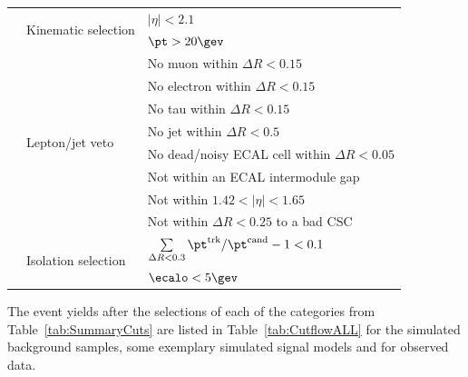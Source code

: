 \begin{table}[!h]
{\begin{tabular}{l|l|l}
                                                              &  \multirow{2}{*}{Kinematic selection}      & $|\eta|<2.1$ \\
                                                              &                                            & $\pt>20\gev$ \\\cmidrule{2-3}

                                                              &  \multirow{8}{*}{Lepton/jet veto}          & No muon within $\Delta R<0.15$ \\
                                                              &                                            & No electron within $\Delta R<0.15$ \\
                                                              &                                            & No tau within $\Delta R<0.15$ \\
                                                              &                                            & No jet within $\Delta R<0.5$ \\
                                                              &                                            & No dead/noisy ECAL cell within $\Delta R<0.05$  \\
                                                              &                                            & Not within an ECAL intermodule gap  \\
                                                              &                                            & Not within $1.42<|\eta|<1.65$ \\
                                                              &                                            & Not within $\Delta R<0.25$ to a bad CSC \\\cmidrule{2-3}

                                                              &  \multirow{2}{*}{Isolation selection}      & $\sum \limits_{\Delta R < 0.3} \pt^{\text{trk}}/\pt^{\text{cand}} -1  < 0.1$ \\
                                                              &                                            & $\ecalo<5\gev$ \\


\bottomrule
\end{tabular}}
\end{table}
The event yields after the selections of each of the categories from Table~\ref{tab:SummaryCuts} are listed in Table~\ref{tab:CutflowALL} for the simulated background samples, some exemplary simulated signal models and for observed data.
